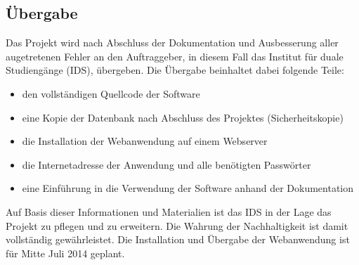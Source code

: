 \subsection{Übergabe}
\label{sec:Uebergabe}

Das Projekt wird nach Abschluss der Dokumentation und Ausbesserung aller augetretenen Fehler an den Auftraggeber, in diesem Fall das Institut für duale Studiengänge (IDS), übergeben. Die Übergabe beinhaltet dabei folgende Teile:

\begin{itemize}
  \item den vollständigen Quellcode der Software
  \item eine Kopie der Datenbank nach Abschluss des Projektes (Sicherheitskopie)
  \item die Installation der Webanwendung auf einem Webserver
  \item die Internetadresse der Anwendung und alle benötigten Passwörter
  \item eine Einführung in die Verwendung der Software anhand der Dokumentation
\end{itemize}

Auf Basis dieser Informationen und Materialien ist das IDS in der Lage das Projekt zu pflegen und zu erweitern. Die Wahrung der Nachhaltigkeit ist damit vollständig gewährleistet. Die Installation und Übergabe der Webanwendung ist für Mitte Juli 2014 geplant.